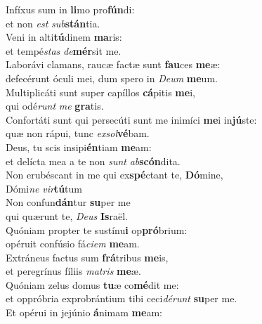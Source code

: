 \evenverse Infíxus sum in \textbf{li}mo pro\textbf{fún}di:~\*\\
\evenverse et non \textit{est} \textit{sub}\textbf{stán}tia.\\
\oddverse Veni in alti\textbf{tú}dinem \textbf{ma}ris:~\*\\
\oddverse et tempé\textit{stas} \textit{de}\textbf{mér}sit me.\\
\evenverse Laborávi clamans, raucæ factæ sunt \textbf{fau}ces \textbf{me}æ:~\*\\
\evenverse defecérunt óculi mei, dum spero in \textit{De}\textit{um} \textbf{me}um.\\
\oddverse Multiplicáti sunt super capíllos \textbf{cá}pitis \textbf{me}i,~\*\\
\oddverse qui odé\textit{runt} \textit{me} \textbf{gra}tis.\\
\evenverse Confortáti sunt qui persecúti sunt me inimíci \textbf{me}i in\textbf{jú}ste:~\*\\
\evenverse quæ non rápui, tunc \textit{ex}\textit{sol}\textbf{vé}bam.\\
\oddverse Deus, tu scis insipi\textbf{én}tiam \textbf{me}am:~\*\\
\oddverse et delícta mea a te non \textit{sunt} \textit{ab}\textbf{scón}dita.\\
\evenverse Non erubéscant in me qui ex\textbf{spé}ctant te, \textbf{Dó}mine,~\*\\
\evenverse Dómi\textit{ne} \textit{vir}\textbf{tú}tum\\
\oddverse Non confun\textbf{dán}tur \textbf{su}per me~\*\\
\oddverse qui quærunt te, \textit{De}\textit{us} \textbf{Is}raël.\\
\evenverse Quóniam propter te sustínu\textbf{i} op\textbf{pró}brium:~\*\\
\evenverse opéruit confúsio fá\textit{ci}\textit{em} \textbf{me}am.\\
\oddverse Extráneus factus sum \textbf{frá}tribus \textbf{me}is,~\*\\
\oddverse et peregrínus fíliis \textit{ma}\textit{tris} \textbf{me}æ.\\
\evenverse Quóniam zelus domus \textbf{tu}æ co\textbf{mé}dit me:~\*\\
\evenverse et oppróbria exprobrántium tibi ceci\textit{dé}\textit{runt} \textbf{su}per me.\\
\oddverse Et opérui in jejúnio \textbf{á}nimam \textbf{me}am:~\*\\
